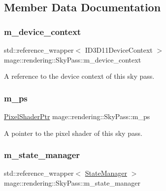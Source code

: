 \subsection{Member Data Documentation}
\hypertarget{classmage_1_1rendering_1_1_sky_pass_a5639f9eb6bf863074c5e5afba2f0e2f5}{}\label{classmage_1_1rendering_1_1_sky_pass_a5639f9eb6bf863074c5e5afba2f0e2f5} 
\subsubsection{\texorpdfstring{m\+\_\+device\+\_\+context}{m\_device\_context}}
{\footnotesize\ttfamily std\+::reference\+\_\+wrapper$<$ I\+D3\+D11\+Device\+Context $>$ mage\+::rendering\+::\+Sky\+Pass\+::m\+\_\+device\+\_\+context\hspace{0.3cm}{\ttfamily [private]}}

A reference to the device context of this sky pass. \hypertarget{classmage_1_1rendering_1_1_sky_pass_a945613544f942b4278454a89bb5e1513}{}\label{classmage_1_1rendering_1_1_sky_pass_a945613544f942b4278454a89bb5e1513} 
\subsubsection{\texorpdfstring{m\+\_\+ps}{m\_ps}}
{\footnotesize\ttfamily \hyperlink{namespacemage_1_1rendering_af03d922b228ee9c8542baaa2ecc9f259}{Pixel\+Shader\+Ptr} mage\+::rendering\+::\+Sky\+Pass\+::m\+\_\+ps\hspace{0.3cm}{\ttfamily [private]}}

A pointer to the pixel shader of this sky pass. \hypertarget{classmage_1_1rendering_1_1_sky_pass_aed4f451eb046158e856fdda6de9856f5}{}\label{classmage_1_1rendering_1_1_sky_pass_aed4f451eb046158e856fdda6de9856f5} 
\subsubsection{\texorpdfstring{m\+\_\+state\+\_\+manager}{m\_state\_manager}}
{\footnotesize\ttfamily std\+::reference\+\_\+wrapper$<$ \hyperlink{classmage_1_1rendering_1_1_state_manager}{State\+Manager} $>$ mage\+::rendering\+::\+Sky\+Pass\+::m\+\_\+state\+\_\+manager\hspace{0.3cm}{\ttfamily [private]}}

